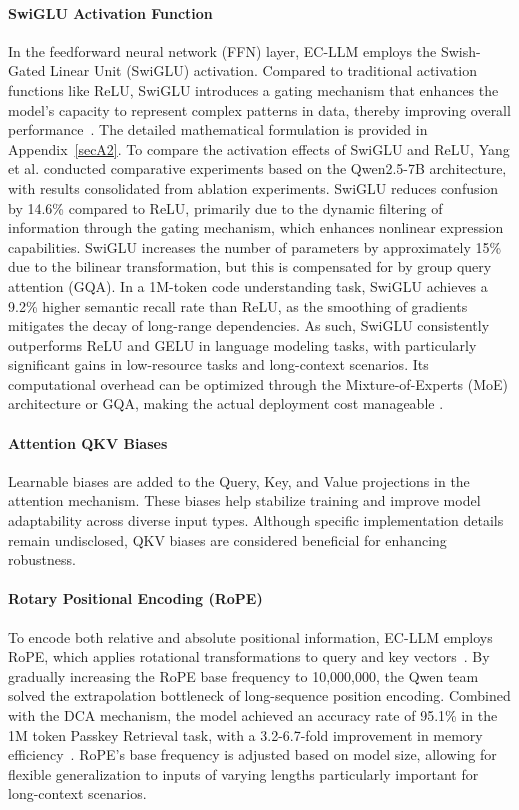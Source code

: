\documentclass[]{interact}
\theoremstyle{plain}%
\theoremstyle{definition}
\theoremstyle{remark}
\begin{document}
\paragraph{SwiGLU Activation Function} In the feedforward neural network (FFN) layer, EC-LLM employs the Swish-Gated Linear Unit (SwiGLU) activation. Compared to traditional activation functions like ReLU, SwiGLU introduces a gating mechanism that enhances the model's capacity to represent complex patterns in data, thereby improving overall performance~\cite{shazeer2020glu}. The detailed mathematical formulation is provided in Appendix~\ref{secA2}.
To compare the activation effects of SwiGLU and ReLU, Yang et al. conducted comparative experiments based on the Qwen2.5-7B architecture, with results consolidated from ablation experiments. SwiGLU reduces confusion by 14.6\% compared to ReLU, primarily due to the dynamic filtering of information through the gating mechanism, which enhances nonlinear expression capabilities. SwiGLU increases the number of parameters by approximately 15\% due to the bilinear transformation, but this is compensated for by group query attention (GQA). In a 1M-token code understanding task, SwiGLU achieves a 9.2\% higher semantic recall rate than ReLU, as the smoothing of gradients mitigates the decay of long-range dependencies. As such, SwiGLU consistently outperforms ReLU and GELU in language modeling tasks, with particularly significant gains in low-resource tasks and long-context scenarios. Its computational overhead can be optimized through the Mixture-of-Experts (MoE) architecture or GQA, making the actual deployment cost manageable \cite{yang2025qwen2}.

\paragraph{Attention QKV Biases} Learnable biases are added to the Query, Key, and Value projections in the attention mechanism. These biases help stabilize training and improve model adaptability across diverse input types. Although specific implementation details remain undisclosed, QKV biases are considered beneficial for enhancing robustness.

\paragraph{Rotary Positional Encoding (RoPE)} To encode both relative and absolute positional information, EC-LLM employs RoPE, which applies rotational transformations to query and key vectors~\cite{su2024roformer}. By gradually increasing the RoPE base frequency to 10,000,000, the Qwen team solved the extrapolation bottleneck of long-sequence position encoding. Combined with the DCA mechanism, the model achieved an accuracy rate of 95.1\% in the 1M token Passkey Retrieval task, with a 3.2-6.7-fold improvement in memory efficiency~\cite{yang2025qwen2}. RoPE’s base frequency is adjusted based on model size, allowing for flexible generalization to inputs of varying lengths\textemdash{} particularly important for long-context scenarios.
\end{document}
